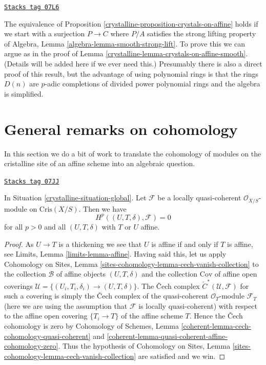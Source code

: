 \begin{remark}
\label{crystalline-remark-equivalence-more-general}
\href{https://stacks.math.columbia.edu/tag/07L6}{\texttt{Stacks tag 07L6}}

The equivalence of Proposition \ref{crystalline-proposition-crystals-on-affine}
holds if we start with a surjection $P \to C$ where $P/A$ satisfies the
strong lifting property of
Algebra, Lemma \ref{algebra-lemma-smooth-strong-lift}.
To prove this we can argue as in the proof of
Lemma \ref{crystalline-lemma-crystals-on-affine-smooth}.
(Details will be added here if we ever need this.)
Presumably there is also a direct proof of this result, but the advantage
of using polynomial rings is that the rings $D(n)$ are $p$-adic completions
of divided power polynomial rings and the algebra is simplified.
\end{remark}

\section{General remarks on cohomology}
\label{crystalline-section-cohomology-lqc}
In this section we do a bit of work to translate the cohomology
of modules on the cristalline site of an affine scheme into
an algebraic question.

\begin{lemma}
\label{crystalline-lemma-vanishing-lqc}
\href{https://stacks.math.columbia.edu/tag/07JJ}{\texttt{Stacks tag 07JJ}}

In Situation \ref{crystalline-situation-global}.
Let $\mathcal{F}$ be a locally quasi-coherent $\mathcal{O}_{X/S}$-module
on $\text{Cris}(X/S)$. Then we have
$$
H^p((U, T, \delta), \mathcal{F}) = 0
$$
for all $p > 0$ and all $(U, T, \delta)$ with $T$ or $U$ affine.
\end{lemma}

\begin{proof}
As $U \to T$ is a thickening we see that $U$ is affine if and only if $T$
is affine, see Limits, Lemma \ref{limits-lemma-affine}.
Having said this, let us apply
Cohomology on Sites, Lemma \ref{sites-cohomology-lemma-cech-vanish-collection}
to the collection $\mathcal{B}$ of affine objects $(U, T, \delta)$ and the
collection $\text{Cov}$ of affine open coverings
$\mathcal{U} = \{(U_i, T_i, \delta_i) \to (U, T, \delta)\}$. The
{\v C}ech complex
${\check C}^*(\mathcal{U}, \mathcal{F})$ for such a covering is simply
the {\v C}ech complex of the quasi-coherent $\mathcal{O}_T$-module
$\mathcal{F}_T$
(here we are using the assumption that $\mathcal{F}$ is locally quasi-coherent)
with respect to the affine open covering $\{T_i \to T\}$ of the
affine scheme $T$. Hence the {\v C}ech cohomology is zero by
Cohomology of Schemes, Lemma
\ref{coherent-lemma-cech-cohomology-quasi-coherent} and
\ref{coherent-lemma-quasi-coherent-affine-cohomology-zero}.
Thus the hypothesis of
Cohomology on Sites, Lemma \ref{sites-cohomology-lemma-cech-vanish-collection}
are satisfied and we win.
\end{proof}


